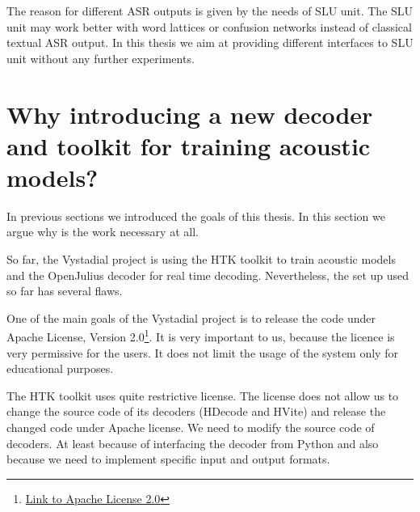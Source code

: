 The reason for different ASR outputs is given by the needs of SLU unit. The SLU unit may work better with word lattices or confusion networks instead of classical textual ASR output. In this thesis we aim at providing different interfaces to SLU unit without any further experiments.



    
\section{Why introducing a new decoder and toolkit for training acoustic models?} 
\label{sec:why}
In previous sections we introduced the goals of this thesis. In this section we argue why is the work necessary at all.

So far, the Vystadial project is using the HTK toolkit to train acoustic models and the OpenJulius decoder for real time decoding.
Nevertheless, the set up used so far has several flaws.

One of the main goals of the Vystadial project is to release the code under Apache License, Version 2.0\footnote{\href{http://www.apache.org/licenses/LICENSE-2.0.html}{Link to Apache License 2.0}}. It is very important to us, because the licence is very permissive for the users. It does not limit the usage of the system only for educational purposes.

The HTK toolkit uses quite restrictive license. The license does not allow us to change the source code of its decoders (HDecode and HVite) and release the changed code under Apache license. We need to modify the source code of decoders. At least because of interfacing the decoder from Python and also because we need to implement specific input and output formats.

